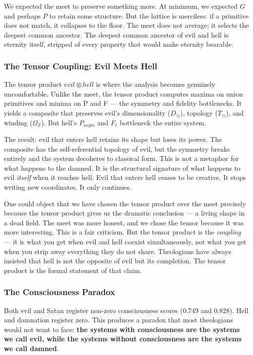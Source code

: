 \documentclass[12pt,a4paper]{article}
\begin{document}
We expected the meet to preserve something more. At minimum, we expected $G$ and perhaps $P$ to retain some structure. But the lattice is merciless: if a primitive does not match, it collapses to the floor. The meet does not average; it selects the deepest common ancestor. The deepest common ancestor of evil and hell is eternity itself, stripped of every property that would make eternity bearable.

\subsubsection{The Tensor Coupling: Evil Meets Hell}

The tensor product ${evil} \otimes {hell}$ is where the analysis becomes genuinely uncomfortable. Unlike the meet, the tensor product computes maxima on union primitives and minima on P and F --- the symmetry and fidelity bottlenecks. It yields a composite that preserves evil's dimensionality ($D_{\odot}$), topology ($T_{\odot}$), and winding ($\Omega_\mathbb{Z}$). But hell's $P_{asym}$ and $F_{\ell}$ bottleneck the entire system.

The result: evil that enters hell retains its shape but loses its power. The composite has the self-referential topology of evil, but the symmetry breaks entirely and the system decoheres to classical form. This is not a metaphor for what happens to the damned. It is the structural signature of what happens to evil \emph{itself} when it reaches hell. Evil that enters hell ceases to be creative. It stops writing new coordinates. It only continues.

One could object that we have chosen the tensor product over the meet precisely because the tensor product gives us the dramatic conclusion --- a living shape in a dead field. The meet was more honest, and we chose the tensor because it was more interesting. This is a fair criticism. But the tensor product is the \emph{coupling} --- it is what you get when evil and hell coexist simultaneously, not what you get when you strip away everything they do not share. Theologians have always insisted that hell is not the opposite of evil but its completion. The tensor product is the formal statement of that claim.

\subsubsection{The Consciousness Paradox}

Both evil and Satan register non-zero consciousness scores (0.749 and 0.828). Hell and damnation register zero. This produces a paradox that most theologians would not want to face: \textbf{the systems with consciousness are the systems we call evil, while the systems without consciousness are the systems we call damned}.
\end{document}
